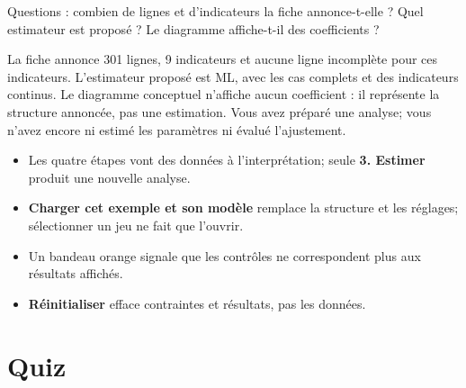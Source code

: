 \documentclass[
  french,
  11pt,
  a4paper,
  DIV=11,
  numbers=noendperiod]{scrreprt}
\providecommand{\tightlist}{%
  \setlength{\itemsep}{0pt}\setlength{\parskip}{0pt}}
\begin{document}
Questions : combien de lignes et d'indicateurs la fiche annonce-t-elle ?
Quel estimateur est proposé ? Le diagramme affiche-t-il des coefficients
?

\begin{tcolorbox}[enhanced jigsaw, arc=.35mm, bottomrule=.15mm, bottomtitle=1mm, breakable, colback=white, colbacktitle=quarto-callout-tip-color!10!white, colframe=quarto-callout-tip-color-frame, coltitle=black, left=2mm, leftrule=.75mm, opacityback=0, opacitybacktitle=0.6, rightrule=.15mm, title={Réponse}, titlerule=0mm, toprule=.15mm, toptitle=1mm]

La fiche annonce 301 lignes, 9 indicateurs et aucune ligne incomplète
pour ces indicateurs. L'estimateur proposé est ML, avec les cas complets
et des indicateurs continus. Le diagramme conceptuel n'affiche aucun
coefficient : il représente la structure annoncée, pas une estimation.
Vous avez préparé une analyse; vous n'avez encore ni estimé les
paramètres ni évalué l'ajustement.

\end{tcolorbox}

\begin{tcolorbox}[enhanced jigsaw, arc=.35mm, bottomrule=.15mm, bottomtitle=1mm, breakable, colback=white, colbacktitle=quarto-callout-important-color!10!white, colframe=quarto-callout-important-color-frame, coltitle=black, left=2mm, leftrule=.75mm, opacityback=0, opacitybacktitle=0.6, rightrule=.15mm, title={À retenir}, titlerule=0mm, toprule=.15mm, toptitle=1mm]

\begin{itemize}
\tightlist
\item
  Les quatre étapes vont des données à l'interprétation; seule
  \textbf{3. Estimer} produit une nouvelle analyse.
\item
  \textbf{Charger cet exemple et son modèle} remplace la structure et
  les réglages; sélectionner un jeu ne fait que l'ouvrir.
\item
  Un bandeau orange signale que les contrôles ne correspondent plus aux
  résultats affichés.
\item
  \textbf{Réinitialiser} efface contraintes et résultats, pas les
  données.
\end{itemize}

\end{tcolorbox}

\section{Quiz}\label{quiz-1}
\end{document}
